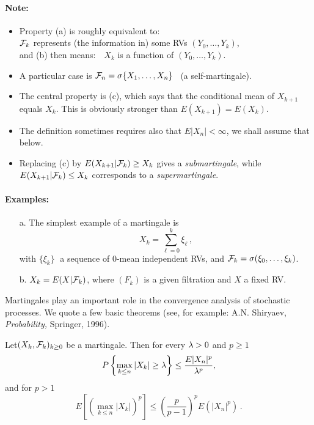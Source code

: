 \paragraph{Note:}
\begin{itemize}
\item
Property (a) is roughly equivalent to:\\
\hspace*{2cm}$\mathcal F_k$ represents (the information in)
some RVs $(Y_0, \ldots, Y_k)$,
\\
and (b) then means:\ \
$X_k$  is a function of $(Y_0, \ldots, Y_k)$.
\item
A particular case is $\mathcal F_n=\sigma\{X_1,\dots,X_n\}$
\ (a self-martingale).
\item
The central property is (c), which says that the conditional mean
of $X_{k+1}$ equals $X_k$. This is obviously
stronger than  $E(X_{k+1})=E(X_k)$.
\item
The definition sometimes requires also that $E|X_n|<\infty$,
we shall assume that below.
\item
Replacing (c) by $E(X_{k+1} | \mathcal F_k) \geq X_k$ gives a {\em submartingale},
while $E(X_{k+1} | \mathcal F_k) \leq X_k$ corresponds to a {\em supermartingale}.
\end{itemize}

\paragraph{Examples:}
\begin{itemize}
\item[a.]
The simplest {example} of a martingale is
$$
X_k = \sum_{\ell=0}^k \xi_\ell\,,
$$
with $\{\xi_k\}\;$ a sequence of 0-mean independent RVs, and
$\mathcal F_k= \sigma (\xi_0, \ldots, \xi_k)$.
\item[b.]
$X_k=E(X|\mathcal F_k)$, where $(F_k)$ is a given filtration and $X$ a fixed RV.
\end{itemize}

Martingales play an important role in the convergence analysis of
stochastic processes. We quote a few basic theorems
(see, for example: A.N. Shiryaev, {\it Probability,} Springer, 1996).

\begin{theorem}

Let$(X_k, \mathcal F_k)_{k\ge 0}$ be a martingale. Then for every $\lambda>0$ and $p\ge 1$
$$
P\left\{ \max_{k\le n} |X_k| \ge \lambda \right\} \le \frac{E |X_n|^p}{\lambda^p},
$$
and for $p>1$
$$
E[(\max_{k\le n}|X_k|)^p ] \le \textstyle{(\frac{p}{p-1})^p} E(|X_n|^p) \,.
$$
\end{theorem}

